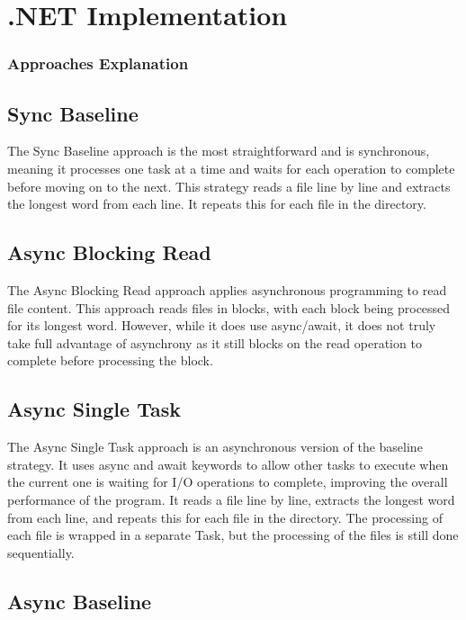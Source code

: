 \section{.NET Implementation}
\label{sec:dotnet_implementation}



\subsubsection{Approaches Explanation}

\subsection{Sync Baseline}

The Sync Baseline approach is the most straightforward and is synchronous, meaning it processes one task at a time and waits for each operation to complete before moving on to the next. This strategy reads a file line by line and extracts the longest word from each line. It repeats this for each file in the directory.

\subsection{Async Blocking Read}

The Async Blocking Read approach applies asynchronous programming to read file content. This approach reads files in blocks, with each block being processed for its longest word. However, while it does use async/await, it does not truly take full advantage of asynchrony as it still blocks on the read operation to complete before processing the block. 

\subsection{Async Single Task}

The Async Single Task approach is an asynchronous version of the baseline strategy. It uses async and await keywords to allow other tasks to execute when the current one is waiting for I/O operations to complete, improving the overall performance of the program. It reads a file line by line, extracts the longest word from each line, and repeats this for each file in the directory. The processing of each file is wrapped in a separate Task, but the processing of the files is still done sequentially. 

\subsection{Async Baseline}

